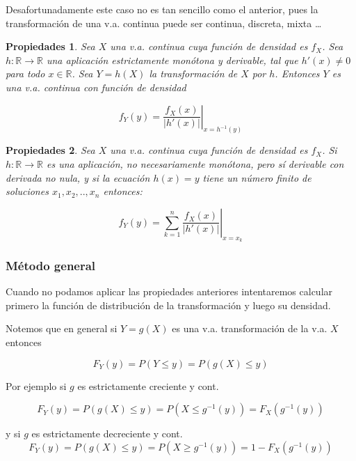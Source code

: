 \documentclass[handout]{beamer}\usepackage[]{graphicx}\usepackage[]{color}
\newcommand{\RR}{\mathbb{R}}
\renewcommand{\leq}{\leqslant}
\renewcommand{\geq}{\geqslant}
\theoremstyle{plain}
\newtheorem{prop}{Propiedades}
\theoremstyle{definition}
\begin{document}
\begin{frame}



Desafortunadamente este caso no es tan sencillo como el anterior, pues la
transformación de una v.a. continua puede ser continua, discreta, mixta \ldots

\begin{prop}
Sea $X$ una v.a. continua cuya función de densidad es $f_{X}$. Sea
$h:\RR\to\RR$ una aplicación estrictamente monótona y derivable, tal
que $h'(x)\not=0$ para todo $x\in\RR$. Sea $Y=h(X)$ la
transformación de $X$ por $h$. Entonces $Y$ es una v.a. continua con función
de densidad

$$f_{Y}(y)=\left.\frac{f_{X}(x)}
{\left|h'(x)\right|}\right|_{x=h^{-1}(y)}$$
\end{prop}
\end{frame}

\begin{frame}

\begin{prop}
Sea $X$ una v.a. continua cuya función de densidad es $f_{X}$. Si
$h:\RR\to\RR$ es  una aplicación, no necesariamente monótona,
pero sí derivable con derivada no nula, y si
la ecuación $h(x)=y$ tiene un número finito de soluciones
$x_{1},x_{2},..,x_{n}$ entonces:

$$\displaystyle f_{Y}(y)=\left.\sum_{k=1}^{n} \frac{f_{X}(x)}
{\left|h'(x)\right|}\right|_{x=x_{k}}$$
\end{prop}
\end{frame}
\subsubsection{Método general}
\begin{frame}


Cuando no podamos aplicar las propiedades anteriores intentaremos
calcular primero la función de distribución de la transformación
y luego su densidad.

Notemos que en general si $Y=g(X)$ es una v.a. transformación  de la
v.a. $X$ entonces

$$F_{Y}(y)=P(Y\leq y)=P(g(X)\leq y)$$

Por ejemplo si $g$ es estrictamente creciente y cont.

$$F_{Y}(y)=P(g(X)\leq y)=P(X\leq g^{-1}(y))=F_{X}(g^{-1}(y))$$

y si $g$ es estrictamente decreciente y cont.
$$F_{Y}(y)=P(g(X)\leq y)=P(X\geq g^{-1}(y))=1-F_{X}(g^{-1}(y))$$

\end{frame}
\end{document}
